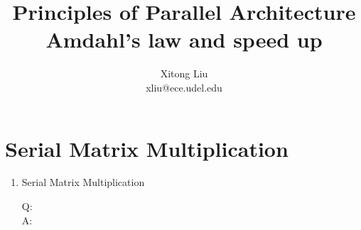 \documentclass[12pt]{article}
\title{Principles of Parallel Architecture\\
Amdahl’s law and speed up}
\author{Xitong Liu \\
xliu@ece.udel.edu}
\begin{document}
\maketitle

\section{Serial Matrix Multiplication}
\begin{enumerate}

\item Serial Matrix Multiplication
\begin{description}
\item[Q:] 
\item[A:] 
\end{description}

\end{enumerate}
\end{document}
